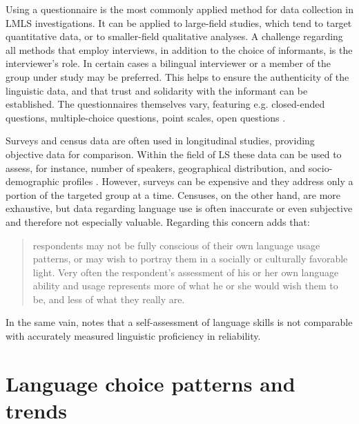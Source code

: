 \documentclass[output=paper]{langscibook}
\begin{document}
Using a questionnaire is the most commonly applied method for data collection in LMLS investigations. It can be applied to large-field studies, which tend to target quantitative data, or to smaller-field qualitative analyses. A challenge regarding all methods that employ interviews, in addition to the choice of informants, is the interviewer's role. In certain cases a bilingual interviewer or a member of the group under study may be preferred. This helps to ensure the authenticity of the linguistic data, and that trust and solidarity with the informant can be established. The questionnaires themselves vary, featuring e.g. closed-ended questions, multiple-choice questions, point scales, open questions \parencite[53--61]{Pauwels2016}.

Surveys and census data are often used in longitudinal studies, providing objective data for comparison. Within the field of LS these data can be used to assess, for instance, number of speakers, geographical distribution, and socio-demographic profiles \parencite{Clyne1991}. However, surveys can be expensive and they address only a portion of the targeted group at a time. Censuses, on the other hand, are more exhaustive, but data regarding language use is often inaccurate or even subjective and therefore not especially valuable. Regarding this concern \textcite[para. 16]{Buda1992} adds that:

\begin{quote}
respondents may not be fully conscious of their own language usage patterns, or may wish to portray them in a socially or culturally favorable light. Very often the respondent's assessment of his or her own language ability and usage represents more of what he or she would wish them to be, and less of what they really are.
\end{quote}

\noindent In the same vain, \textcite[66]{Pauwels2016} notes that a self-assessment of language skills is not comparable with accurately measured linguistic proficiency in reliability.

\section{Language choice patterns and trends}
\label{sec:shift:patterns}
\end{document}
